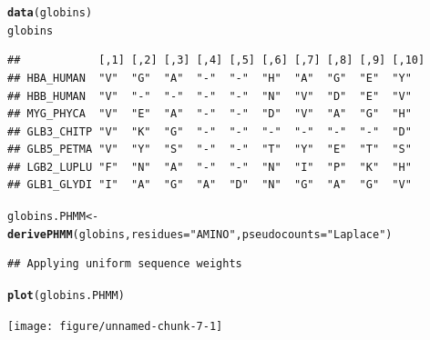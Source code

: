 \documentclass{article}\usepackage[]{graphicx}\usepackage[]{color}
\makeatletter
\newcommand{\hlstr}[1]{\textcolor[rgb]{0.192,0.494,0.8}{#1}}%
\newcommand{\hlstd}[1]{\textcolor[rgb]{0.345,0.345,0.345}{#1}}%
\newcommand{\hlkwb}[1]{\textcolor[rgb]{0.69,0.353,0.396}{#1}}%
\newcommand{\hlkwc}[1]{\textcolor[rgb]{0.333,0.667,0.333}{#1}}%
\newcommand{\hlkwd}[1]{\textcolor[rgb]{0.737,0.353,0.396}{\textbf{#1}}}%
\newenvironment{kframe}{%
 \def\at@end@of@kframe{}%
 \ifinner\ifhmode%
  \def\at@end@of@kframe{\end{minipage}}%
  \begin{minipage}{\columnwidth}%
 \fi\fi%
 \def\FrameCommand##1{\hskip\@totalleftmargin \hskip-\fboxsep
 \colorbox{shadecolor}{##1}\hskip-\fboxsep
     \hskip-\linewidth \hskip-\@totalleftmargin \hskip\columnwidth}%
 \MakeFramed {\advance\hsize-\width
   \@totalleftmargin\z@ \linewidth\hsize
   \@setminipage}}%
 {\par\unskip\endMakeFramed%
 \at@end@of@kframe}
\newenvironment{knitrout}{}{} %
\makeatother
\begin{document}
\begin{center}
\begin{knitrout}
\color{fgcolor}\begin{kframe}
\begin{alltt}
\hlkwd{data}\hlstd{(globins)}
\hlstd{globins}
\end{alltt}
\begin{verbatim}
##            [,1] [,2] [,3] [,4] [,5] [,6] [,7] [,8] [,9] [,10]
## HBA_HUMAN  "V"  "G"  "A"  "-"  "-"  "H"  "A"  "G"  "E"  "Y"  
## HBB_HUMAN  "V"  "-"  "-"  "-"  "-"  "N"  "V"  "D"  "E"  "V"  
## MYG_PHYCA  "V"  "E"  "A"  "-"  "-"  "D"  "V"  "A"  "G"  "H"  
## GLB3_CHITP "V"  "K"  "G"  "-"  "-"  "-"  "-"  "-"  "-"  "D"  
## GLB5_PETMA "V"  "Y"  "S"  "-"  "-"  "T"  "Y"  "E"  "T"  "S"  
## LGB2_LUPLU "F"  "N"  "A"  "-"  "-"  "N"  "I"  "P"  "K"  "H"  
## GLB1_GLYDI "I"  "A"  "G"  "A"  "D"  "N"  "G"  "A"  "G"  "V"
\end{verbatim}
\begin{alltt}
\hlstd{globins.PHMM} \hlkwb{<-} \hlkwd{derivePHMM}\hlstd{(globins,} \hlkwc{residues} \hlstd{=} \hlstr{"AMINO"}\hlstd{,} \hlkwc{pseudocounts} \hlstd{=} \hlstr{"Laplace"}\hlstd{)}
\end{alltt}
\begin{verbatim}
## Applying uniform sequence weights
\end{verbatim}
\begin{alltt}
\hlkwd{plot}\hlstd{(globins.PHMM)}
\end{alltt}
\end{kframe}
\texttt{[image: figure/unnamed-chunk-7-1]} 
\end{knitrout}
\end{center}

\newpage
\end{document}
